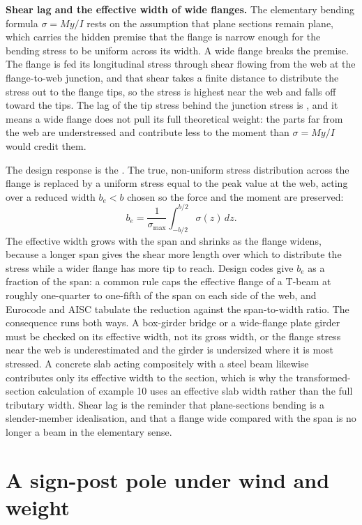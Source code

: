 \begin{mastery}
\textbf{Shear lag and the effective width of wide flanges.} The
elementary bending formula $\sigma = My/I$ rests on the assumption that
plane sections remain plane, which carries the hidden premise that the
flange is narrow enough for the bending stress to be uniform across its
width. A wide flange breaks the premise. The flange is fed its
longitudinal stress through shear flowing from the web at the
flange-to-web junction, and that shear takes a finite distance to
distribute the stress out to the flange tips, so the stress is highest
near the web and falls off toward the tips. The lag of the tip stress
behind the junction stress is , and it means a wide
flange does not pull its full theoretical weight: the parts far from the
web are understressed and contribute less to the moment than $\sigma =
My/I$ would credit them.

The design response is the . The true,
non-uniform stress distribution across the flange is replaced by a
uniform stress equal to the peak value at the web, acting over a reduced
width $b_e < b$ chosen so the force and the moment are preserved:
\[
b_e = \frac{1}{\sigma_{\max}}\int_{-b/2}^{b/2} \sigma(z)\,dz.
\]
The effective width grows with the span and shrinks as the flange widens,
because a longer span gives the shear more length over which to
distribute the stress while a wider flange has more tip to reach. Design
codes give $b_e$ as a fraction of the span: a common rule caps the
effective flange of a T-beam at roughly one-quarter to one-fifth of the
span on each side of the web, and Eurocode and AISC tabulate the
reduction against the span-to-width ratio. The consequence runs both
ways. A box-girder bridge or a wide-flange plate girder must be checked
on its effective width, not its gross width, or the flange stress near
the web is underestimated and the girder is undersized where it is most
stressed. A concrete slab acting compositely with a steel beam likewise
contributes only its effective width to the section, which is why the
transformed-section calculation of example 10 uses an effective slab
width rather than the full tributary width. Shear lag is the reminder
that plane-sections bending is a slender-member idealisation, and that a
flange wide compared with the span is no longer a beam in the
elementary sense.
\end{mastery}

\section{A sign-post pole under wind and weight}


